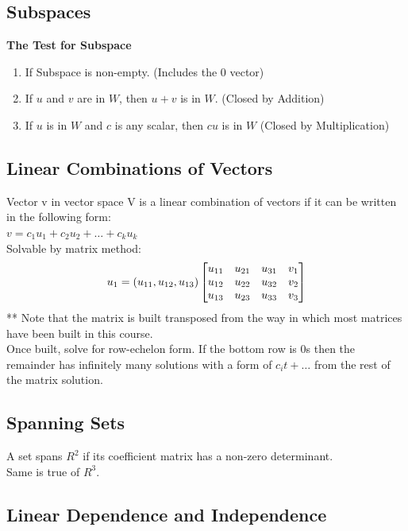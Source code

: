 \documentclass[]{article}
\begin{document}
\subsection{Subspaces}

\textbf{The Test for Subspace} \\
\begin{enumerate}
	\item If Subspace is non-empty. (Includes the 0 vector)
	\item If $u$ and $v$ are in $W$, then $u+v$ is in $W$. (Closed by Addition)
	\item If $u$ is in $W$ and $c$ is any scalar, then $cu$ is in $W$ (Closed by Multiplication)
\end{enumerate}

\subsection{Linear Combinations of Vectors}
Vector v in vector space V is a linear combination of vectors if
it can be written in the following form: \\
$v = c_1 u_1 + c_2 u_2 + \ldots + c_k u_k$ \\
Solvable by matrix method: \\
$$ u_1 = ( u_{11}, u_{12}, u_{13}) \\
\begin{bmatrix}
	u_{11} & u_{21} & u_{31} & v_1 \\
	u_{12} & u_{22} & u_{32} & v_2 \\
	u_{13} & u_{23} & u_{33} & v_3 \\
\end{bmatrix} $$
** Note that the matrix is built transposed from the way in
which most matrices have been built in this course. \\
Once built, solve for row-echelon form. If the bottom row is
0s then the remainder has infinitely many solutions with a form
of $c_it + \ldots$ from the rest of the matrix solution.

\subsection{Spanning Sets}

A set spans $R^2$ if its coefficient matrix has a non-zero determinant. \\
Same is true of $R^3$.

\subsection{Linear Dependence and Independence}
\end{document}
